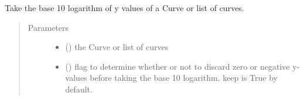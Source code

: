 \documentclass[letterpaper,10pt,english]{sphinxmanual}
\begin{document}

\begin{fulllineitems}
\label{\detokenize{pydv:pydvpy.log10}}
Take the base 10 logarithm of y values of a Curve or list of curves.

\begin{sphinxVerbatim}[commandchars=\\\{\}]
  
\end{sphinxVerbatim}

\begin{sphinxVerbatim}[commandchars=\\\{\}]
 
\end{sphinxVerbatim}

\begin{sphinxVerbatim}[commandchars=\\\{\}]
\PYG{p}{[}\PYG{p}{]}
\end{sphinxVerbatim}
\begin{quote}\begin{description}
\item[{Parameters}] \leavevmode\begin{itemize}
\item {} 
 ({\hyperref[\detokenize{pydv:curve.Curve}]{}}) \textendash{} the Curve or list of curves

\item {} 
 (\sphinxstyleliteralemphasis{\sphinxupquote{, }}) \textendash{} flag to determine whether or not to discard zero or negative y-values before taking the base 10 logarithm.
keep is True by default.

\end{itemize}

\end{description}\end{quote}

\end{fulllineitems}
\end{document}
